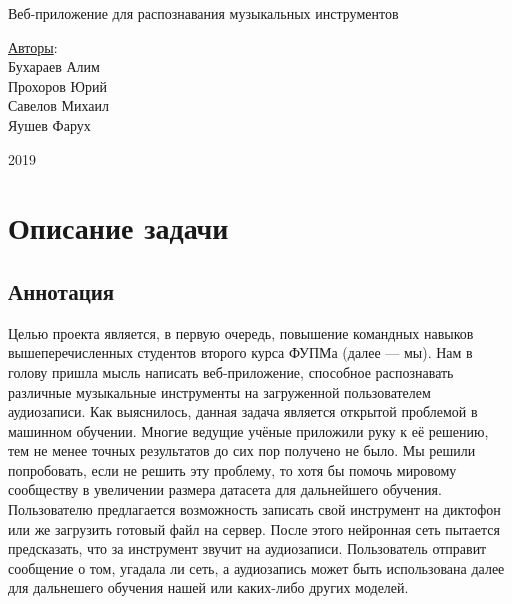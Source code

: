 \documentclass[14pt,a4paper]{article}
\begin{document}
\text{}
\vskip 8cm
\begin{center}
\begin{minipage}{0.8\textwidth}
\begin{center}
\Huge Веб-приложение для распознавания музыкальных инструментов
\end{center}
\end{minipage}
\end{center}

\vskip 7cm

\begin{flushright}
\Large \underline{Авторы}: \\
Бухараев Алим \\
Прохоров Юрий \\
Савелов Михаил \\
Яушев Фарух
\end{flushright}

\vskip 3.6cm

\begin{center}
2019
\end{center}

\newpage

\renewcommand\contentsname{\huge Содержание}
\setcounter{tocdepth}{2}
\Large \tableofcontents
\normalsize

\newpage 

\section[Описание задачи]{\huge Описание задачи}

\subsection{Аннотация}

\qquad Целью проекта является, в первую очередь, повышение командных навыков вышеперечисленных студентов второго курса ФУПМа (далее — мы). Нам в голову пришла мысль написать веб-приложение, способное распознавать различные музыкальные инструменты на загруженной пользователем аудиозаписи. Как выяснилось, данная задача является открытой проблемой в машинном обучении. Многие ведущие учёные приложили руку к её решению, тем не менее точных результатов до сих пор получено не было. Мы решили попробовать, если не решить эту проблему, то хотя бы помочь мировому сообществу в увеличении размера датасета для дальнейшего обучения. \\

Пользователю предлагается возможность записать свой инструмент на диктофон или же загрузить готовый файл на сервер. После этого нейронная сеть пытается предсказать, что за инструмент звучит на аудиозаписи. Пользователь отправит сообщение о том, угадала ли сеть, а аудиозапись может быть использована далее для дальнешего обучения нашей или каких-либо других моделей. \\
\end{document}

